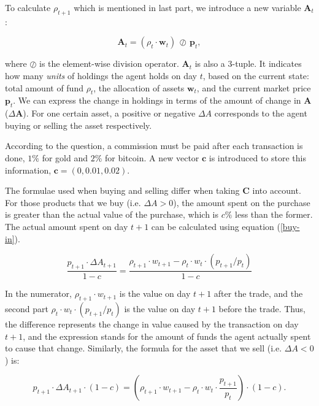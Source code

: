 \documentclass{mcmthesis}
\begin{document}
To calculate $\rho _{t+1}$ which is mentioned in last part,
we introduce a new variable $\pmb{A}_t$:

\begin{equation}
  \pmb{A}_t = (\rho _t \cdot \pmb{w}_t) \, \oslash \, \pmb{p}_t ,
\end{equation}

where $\oslash$ is the element-wise division operator.
$\pmb{A}_t$ is also a 3-tuple.
It indicates how many \textit{units} of holdings the agent holds on day $t$,
based on the current state:
total amount of fund $\rho_t$, the allocation of assets $\pmb{w}_t$,
and the current market price $\pmb{p}_t$.
We can express the change in holdings in terms of the amount of change in $\pmb{A}$ ($\Delta \pmb{A}$).
For one certain asset,
a positive or negative $\Delta A$ corresponds to the agent buying or selling the asset respectively.

According to the question, a commission must be paid after each transaction is done,
$1\%$ for gold and $2\%$ for bitcoin.
A new vector $\pmb{c}$ is introduced to store this information,
$\pmb{c} = (0, 0.01, 0.02)$.

The formulae used when buying and selling differ when taking $\pmb{C}$ into account.
For those products that we buy (i.e. $\Delta A > 0$),
the amount spent on the purchase is greater than the actual value of the purchase,
which is $c\%$ less than the former.
The actual amount spent on day $t+1$ can be calculated using equation (\ref{buy-in}).

\begin{equation}
  \frac{p_{t+1} \cdot \Delta A_{t+1}}{1-c}
  = \frac{\rho _{t+1} \cdot w_{t+1} - \rho _t \cdot w_t \cdot (p_{t+1} / p_t)}{1-c}
  \label{buy-in}
\end{equation}

In the numerator,
$\rho _{t+1} \cdot w_{t+1}$ is the value on day $t+1$ after the trade,
and the second part $\rho _t \cdot w_t \cdot (p_{t+1} / p_t)$
is the value on day $t+1$ before the trade.
Thus, the difference represents the change in value caused by the transaction on day $t+1$,
and the expression stands for the amount of funds the agent actually spent
to cause that change.
Similarly, the formula for the asset that we sell (i.e. $\Delta A < 0$) is:

\begin{equation}
  p_{t+1} \cdot \Delta A_{t+1} \cdot (1 - c)
  = (\rho _{t+1} \cdot w_{t+1} - \rho _t \cdot w_t \cdot \frac{p_{t+1}}{p_t}) \cdot (1-c).
\end{equation}
\end{document}
